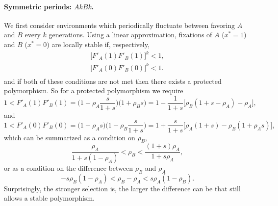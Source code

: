\documentclass[12pt]{extarticle} %
\begin{document}
\paragraph{Symmetric periods: $AkBk$.}
We first consider environments which periodically fluctuate between favoring $A$ and $B$ every $k$ generations.
Using a linear approximation, fixations of $A$ ($x^*=1$) and $B$ ($x^*=0$) are locally stable if, respectively,
\begin{equation}\begin{aligned}
\big[F'_A(1) F'_B(1)\big]^k < 1, \\
\big[F'_A(0) F'_B(0)\big]^k < 1. \\
\end{aligned}\end{equation}
and if both of these conditions are not met then there exists a protected polymorphism.
So for a protected polymorphism we require
\begin{equation}
1 < F'_A(1) F'_B(1) = \Big(1-\rho_A\frac{s}{1+s}\Big)\Big(1+\rho_B s\Big) 
= 1-\frac{1}{1+s}\big[\rho_B(1+s-\rho_A)-\rho_A\big],
\end{equation}
and
\begin{equation}
1 < F'_A(0) F'_B(0) = \Big(1+\rho_A s\Big)\Big(1-\rho_B \frac{s}{1+s}\Big) 
= 1+\frac{s}{1+s}\big[\rho_A(1+s) -\rho_B(1+\rho_A s)\big],
\end{equation}
which can be summarized as a condition on $\rho_B$,
\begin{equation} \label{eq:poly_condition_periodic_fluc}
\frac{\rho_A}{1+s(1-\rho_A)} < \rho_B < \frac{(1+s)\rho_A}{1+s\rho_A},
\end{equation}
or as a condition on the difference between $\rho_B$ and $\rho_A$
\begin{equation}
-s\rho_B(1-\rho_A) < \rho_B - \rho_A < s\rho_A(1-\rho_B).
\end{equation}
Surprisingly, the stronger selection is, the larger the difference can be that still allows a stable polymorphism.
\end{document}

